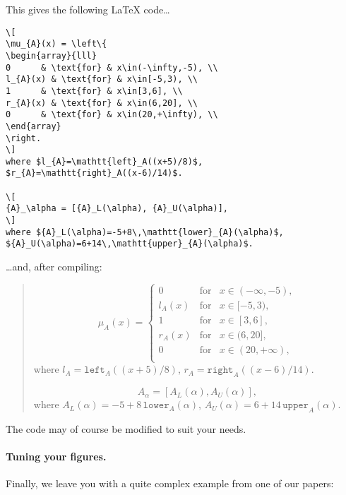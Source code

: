 \documentclass[11pt]{article}\usepackage{graphicx, color}
\begin{document}
\noindent This gives the following \LaTeX{} code\dots
\begin{verbatim}
\[
\mu_{A}(x) = \left\{
\begin{array}{lll}
0      & \text{for} & x\in(-\infty,-5), \\
l_{A}(x) & \text{for} & x\in[-5,3), \\
1      & \text{for} & x\in[3,6], \\
r_{A}(x) & \text{for} & x\in(6,20], \\
0      & \text{for} & x\in(20,+\infty), \\
\end{array}
\right.
\]
where $l_{A}=\mathtt{left}_A((x+5)/8)$,
$r_{A}=\mathtt{right}_A((x-6)/14)$.

\[
{A}_\alpha = [{A}_L(\alpha), {A}_U(\alpha)],
\]
where ${A}_L(\alpha)=-5+8\,\mathtt{lower}_{A}(\alpha)$,
${A}_U(\alpha)=6+14\,\mathtt{upper}_{A}(\alpha)$.

\end{verbatim}

\noindent \dots and, after compiling:

\begin{quote}
\[
\mu_{A}(x) = \left\{
\begin{array}{lll}
0      & \text{for} & x\in(-\infty,-5), \\
l_{A}(x) & \text{for} & x\in[-5,3), \\
1      & \text{for} & x\in[3,6], \\
r_{A}(x) & \text{for} & x\in(6,20], \\
0      & \text{for} & x\in(20,+\infty), \\
\end{array}
\right.
\]
where $l_{A}=\mathtt{left}_A((x+5)/8)$,
$r_{A}=\mathtt{right}_A((x-6)/14)$.

\[
{A}_\alpha = [{A}_L(\alpha), {A}_U(\alpha)],
\]
where ${A}_L(\alpha)=-5+8\,\mathtt{lower}_{A}(\alpha)$,
${A}_U(\alpha)=6+14\,\mathtt{upper}_{A}(\alpha)$.

\end{quote}

\noindent
The code may of course be modified to suit your needs.

\paragraph{Tuning your figures.}
Finally, we leave you with a quite complex example from one of our papers:
\end{document}

